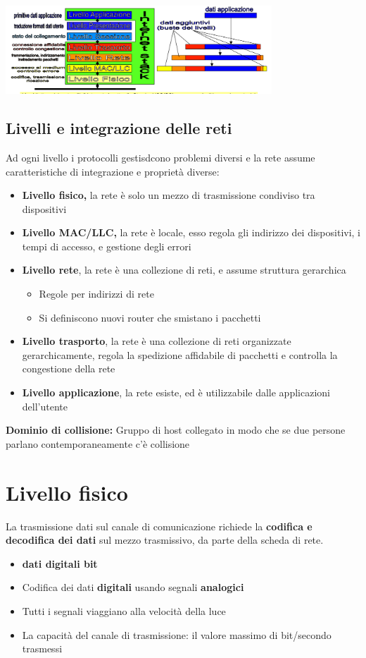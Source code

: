 \documentclass{article}
\begin{document}
\begin{center}
    \includegraphics[width=10cm]{img/architettura2.png}
\end{center}

\subsection{Livelli e integrazione delle reti}

Ad ogni livello i protocolli gestisdcono problemi diversi e la rete assume caratteristiche di integrazione e proprietà diverse:
\begin{itemize}
    \item \textbf{Livello fisico,} la rete è solo un mezzo di trasmissione condiviso tra dispositivi
    \item \textbf{Livello MAC/LLC,} la rete è locale, esso regola gli indirizzo dei dispositivi, i tempi di accesso, e gestione degli errori
    \item \textbf{Livello rete}, la rete è una collezione di reti, e assume struttura gerarchica
    \begin{itemize}
        \item Regole per indirizzi di rete
        \item Si definiscono nuovi router che smistano i pacchetti
    \end{itemize}
    \item \textbf{Livello trasporto}, la rete è una collezione di reti organizzate gerarchicamente, regola la spedizione affidabile di pacchetti e controlla la congestione della rete
    \item \textbf{Livello applicazione}, la rete esiste, ed è utilizzabile dalle applicazioni dell'utente
\end{itemize}
\textbf{Dominio di collisione:} Gruppo di host collegato in modo che se due persone parlano contemporaneamente c'è collisione


\section{Livello fisico}
La trasmissione dati sul canale di comunicazione richiede la \textbf{codifica e decodifica dei dati} sul mezzo trasmissivo, da parte della scheda di rete.
\begin{itemize}
    \item \textbf{dati digitali bit}
    \item Codifica dei dati \textbf{digitali} usando segnali \textbf{analogici}
    \item Tutti i segnali viaggiano alla velocità della luce
    \item La capacità del canale di trasmissione: il valore massimo di bit/secondo trasmessi
\end{itemize}
\end{document}
